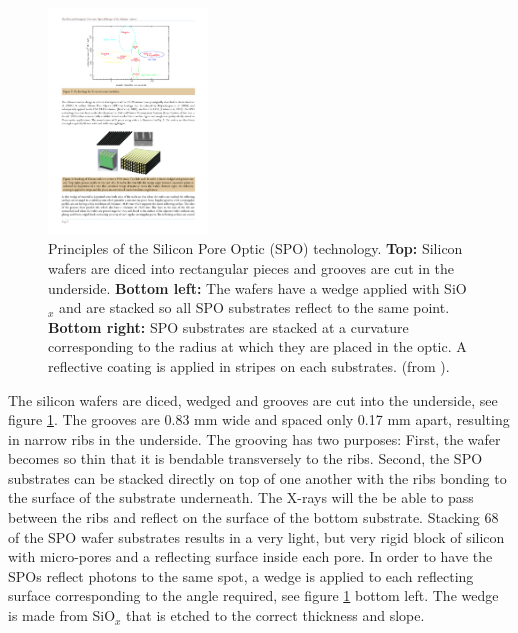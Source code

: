 \begin{figure}[!h]
  \center
  \includegraphics[height=6cm]{figures/athena/spo_principle1.pdf}
\caption{\footnotesize Principles of the Silicon Pore Optic (SPO) technology. \textbf{Top:} Silicon wafers are diced into rectangular pieces and grooves are cut in the underside. \textbf{Bottom left:} The wafers have a wedge applied with SiO$_x$ and are stacked so all SPO substrates reflect to the same point. \textbf{Bottom right:} SPO substrates are stacked at a curvature corresponding to the radius at which they are placed in the optic. A reflective coating is applied in stripes on each substrates. (from \cite{Willingale:2013vo}).}\label{fig:spo_principle1}
\end{figure}


The silicon wafers are diced, wedged and grooves are cut into the underside, see figure \ref{fig:spo_principle1}. The grooves are 0.83 mm wide and spaced only 0.17 mm apart, resulting in narrow ribs in the underside. The grooving has two purposes: First, the wafer becomes so thin that it is bendable transversely to the ribs. Second, the SPO substrates can be stacked directly on top of one another with the ribs bonding to the surface of the substrate underneath. The X-rays will the be able to pass between the ribs and reflect on the surface of the bottom substrate. Stacking 68 of the SPO wafer substrates results in a very light, but very rigid block of silicon with micro-pores and a reflecting surface inside each pore. In order to have the SPOs reflect photons to the same spot, a wedge is applied to each reflecting surface corresponding to the angle required, see figure \ref{fig:spo_principle1} bottom left. The wedge is made from SiO$_x$ that is etched to the correct thickness and slope.

